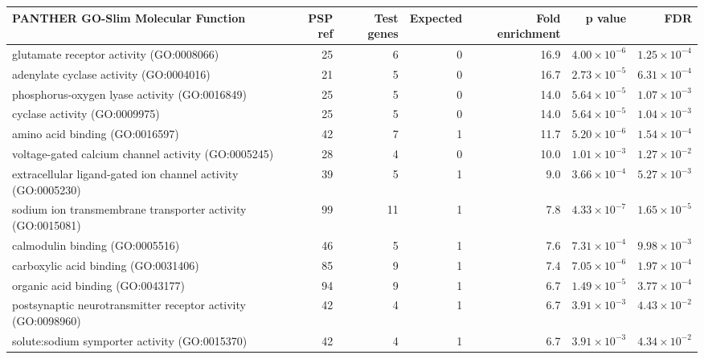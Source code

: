 \begin{table}[ht]
\centering
\begin{adjustbox}{width=\textwidth}
\begin{tabular}{lrrrrrr}
  \hline
PANTHER GO-Slim Molecular Function & PSP ref & Test genes & Expected & Fold enrichment & p value & FDR \\ 
  \hline
glutamate receptor activity (GO:0008066) & 25 & 6 & 0 & 16.9 & $4.00 \times 10^{-6}$ & $1.25 \times 10^{-4}$ \\ 
  adenylate cyclase activity (GO:0004016) & 21 & 5 & 0 & 16.7 & $2.73 \times 10^{-5}$ & $6.31 \times 10^{-4}$ \\ 
  phosphorus-oxygen lyase activity (GO:0016849) & 25 & 5 & 0 & 14.0 & $5.64 \times 10^{-5}$ & $1.07 \times 10^{-3}$ \\ 
  cyclase activity (GO:0009975) & 25 & 5 & 0 & 14.0 & $5.64 \times 10^{-5}$ & $1.04 \times 10^{-3}$ \\ 
  amino acid binding (GO:0016597) & 42 & 7 & 1 & 11.7 & $5.20 \times 10^{-6}$ & $1.54 \times 10^{-4}$ \\ 
  voltage-gated calcium channel activity (GO:0005245) & 28 & 4 & 0 & 10.0 & $1.01 \times 10^{-3}$ & $1.27 \times 10^{-2}$ \\ 
  extracellular ligand-gated ion channel activity (GO:0005230) & 39 & 5 & 1 & 9.0 & $3.66 \times 10^{-4}$ & $5.27 \times 10^{-3}$ \\ 
  sodium ion transmembrane transporter activity (GO:0015081) & 99 & 11 & 1 & 7.8 & $4.33 \times 10^{-7}$ & $1.65 \times 10^{-5}$ \\ 
  calmodulin binding (GO:0005516) & 46 & 5 & 1 & 7.6 & $7.31 \times 10^{-4}$ & $9.98 \times 10^{-3}$ \\ 
  carboxylic acid binding (GO:0031406) & 85 & 9 & 1 & 7.4 & $7.05 \times 10^{-6}$ & $1.97 \times 10^{-4}$ \\ 
  organic acid binding (GO:0043177) & 94 & 9 & 1 & 6.7 & $1.49 \times 10^{-5}$ & $3.77 \times 10^{-4}$ \\ 
  postsynaptic neurotransmitter receptor activity (GO:0098960) & 42 & 4 & 1 & 6.7 & $3.91 \times 10^{-3}$ & $4.43 \times 10^{-2}$ \\ 
  solute:sodium symporter activity (GO:0015370) & 42 & 4 & 1 & 6.7 & $3.91 \times 10^{-3}$ & $4.34 \times 10^{-2}$ \\ 

\end{tabular}
\end{adjustbox}
\end{table}

